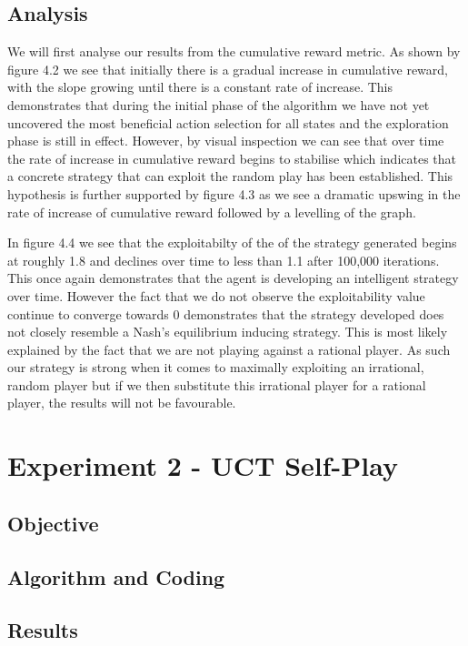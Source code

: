 \subsection{Analysis}\label{subsec:analysis1}
We will first analyse our results from the cumulative reward metric.
As shown by figure 4.2 we see that initially there is a gradual increase in cumulative reward,
with the slope growing until there is a constant rate of increase.
This demonstrates that during the initial phase of the algorithm we have not yet uncovered
the most beneficial action selection for all states and the exploration phase is still in effect.
However, by visual inspection we can see that over time the rate of increase in cumulative
reward begins to stabilise which indicates that a concrete strategy that can exploit
the random play has been established.
This hypothesis is further supported by figure 4.3 as we see a dramatic upswing
in the rate of increase of cumulative reward followed by a levelling of the graph.

In figure 4.4 we see that the exploitabilty of the of the strategy generated begins
at roughly 1.8 and declines over time to less than 1.1 after 100,000 iterations.
This once again demonstrates that the agent is developing an intelligent strategy over time.
However the fact that we do not observe the exploitability value continue to converge towards
0 demonstrates that the strategy developed does not closely resemble a Nash's equilibrium
inducing strategy.
This is most likely explained by the fact that we are not playing against a rational player.
As such our strategy is strong when it comes to maximally exploiting an irrational, random player
but if we then substitute this irrational player for a rational player, the results will not be favourable.
\section{Experiment 2 - UCT Self-Play} \label{sec:experiment2}

\subsection{Objective}\label{subsec:objective2}
\subsection{Algorithm and Coding}\label{subsec:algAndCoding2}
\subsection{Results}\label{subsec:results2}
